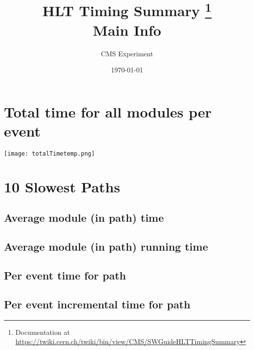\documentclass[10pt,a5paper,landscape]{report}
\title{ \textbf{\Huge{HLT Timing Summary}} \footnote{\large{Documentation at \url{https://twiki.cern.ch/twiki/bin/view/CMS/SWGuideHLTTimingSummary}}} \\ Main Info }
\author{\Large{CMS Experiment}}
\date{\today}
\begin{document}
\maketitle
\newpage
\clearpage
\tableofcontents
\newpage
\newpage \chapter{Total time for all modules per event} \newpage \centering \texttt{[image: totalTimetemp.png]}
\newpage \chapter{10 Slowest Paths}
\section{Average module (in path) time}
\section{Average module (in path) running time}
\section{Per event time for path}
\section{Per event incremental time for path}
\end{document}
